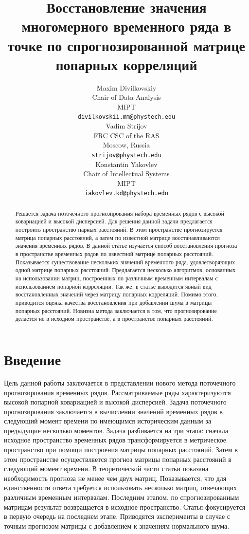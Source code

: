 \documentclass{article}
\title{Восстановление значения многомерного временного ряда в точке по спрогнозированной матрице попарных корреляций}
\author{ Maxim Divilkovskiy \\
	Chair of Data Analysis\\
	MIPT\\
	\texttt{divilkovskii.mm@phystech.edu} \\
	\And
	Vadim Strijov \\
	FRC CSC of the RAS\\
	Moscow, Russia\\
    \texttt{strijov@phystech.edu} \\
    \And
    Konstantin Yakovlev \\
    Chair of Intellectual Systems\\
    MIPT\\
    \texttt{iakovlev.kd@phystech.edu} \\
}
\date{}
\begin{document}
\maketitle

\begin{abstract}
	Решается задача поточечного прогнозирования набора временных рядов с высокой ковариацией и высокой дисперсией. Для решения данной задачи предлагается построить пространство парных расстояний. В этом пространстве прогнозируется матрица попарных расстояний, а затем по известной матрице восстанавливаются значения временных рядов.
	В данной статье изучается способ восстановления прогноза в пространстве временных рядов по известной матрице попарных расстояний. Показывается существование нескольких значений временного ряда, удовлетворяющих одной матрице попарных расстояний. Предлагается несколько алгоритмов, основанных на использовании матриц, построенных по различным временным интервалам с использованием попарной корреляции. Так же, в статье выводится явный вид восстановленных значений через матрицу попарных корреляций. Помимо этого, приводится оценка качества восстановления при добавлении шума в матрицы попарных расстояний. Новизна метода заключается в том, что прогнозирование делается не в исходном пространстве, а в пространстве попарных расстояний.


\end{abstract}



\section{Введение}
	Цель данной работы заключается в представлении нового метода поточечного прогнозирования временных рядов. Рассматриваемые ряды характеризуются высокой попарной ковариацией и высокой дисперсией. Задача поточечного прогнозирования заключается в вычислении значений временных рядов в следующий момент времени по имеющимся историческим данным за предыдущие несколько моментов. Задача разбивается на три этапа: сначала исходное пространство временных рядов трансформируется в метрическое пространство при помощи построения матрицы попарных расстояний. Затем в этом пространстве осуществляется прогноз матрицы попарных расстояний в следующий момент времени. В теоретической части статьи показана необходимость прогноза не менее чем двух матриц. Показывается, что для единственности ответа требуется использовать несколько матриц, отвечающих различным временным интервалам. Последним этапом, по спрогнозированным матрицам результат возвращается в исходное пространство. Статья фокусируется в первую очередь на последнем этапе. Приводятся эксперименты в случае с точным прогнозом матрицы с добавлением к значениям нормального шума.
		
\end{document}
